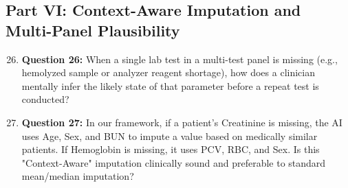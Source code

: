 \documentclass[MTech]{ugthesis}
\begin{document}
\begin{appendices}
\section*{Part VI: Context-Aware Imputation and Multi-Panel Plausibility}
\begin{enumerate}\setcounter{enumi}{25}
    \item \textbf{Question 26:} When a single lab test in a multi-test panel is missing (e.g., hemolyzed sample or analyzer reagent shortage), how does a clinician mentally infer the likely state of that parameter before a repeat test is conducted?
    \item \textbf{Question 27:} In our framework, if a patient's Creatinine is missing, the AI uses Age, Sex, and BUN to impute a value based on medically similar patients. If Hemoglobin is missing, it uses PCV, RBC, and Sex. Is this "Context-Aware" imputation clinically sound and preferable to standard mean/median imputation?
\end{enumerate}


\end{appendices}
\end{document}
